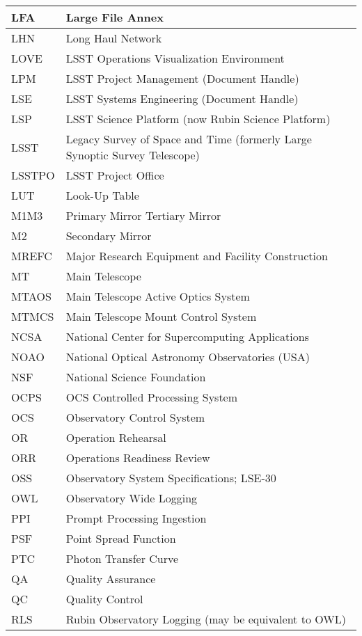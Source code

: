 \begin{longtable}{p{}p{}}
LFA & Large File Annex \\\hline
LHN & Long Haul Network \\\hline
LOVE & LSST Operations Visualization Environment \\\hline
LPM & LSST Project Management (Document Handle) \\\hline
LSE & LSST Systems Engineering (Document Handle) \\\hline
LSP & LSST Science Platform (now Rubin Science Platform) \\\hline
LSST & Legacy Survey of Space and Time (formerly Large Synoptic Survey Telescope) \\\hline
LSSTPO & LSST Project Office \\\hline
LUT & Look-Up Table \\\hline
M1M3 & Primary Mirror Tertiary Mirror \\\hline
M2 & Secondary Mirror \\\hline
MREFC & Major Research Equipment and Facility Construction \\\hline
MT & Main Telescope \\\hline
MTAOS & Main Telescope Active Optics System \\\hline
MTMCS & Main Telescope Mount Control System \\\hline
NCSA & National Center for Supercomputing Applications \\\hline
NOAO & National Optical Astronomy Observatories (USA) \\\hline
NSF & National Science Foundation \\\hline
OCPS & OCS Controlled Processing System \\\hline
OCS & Observatory Control System \\\hline
OR & Operation Rehearsal \\\hline
ORR & Operations Readiness Review \\\hline
OSS & Observatory System Specifications; LSE-30 \\\hline
OWL & Observatory Wide Logging \\\hline
PPI & Prompt Processing Ingestion \\\hline
PSF & Point Spread Function \\\hline
PTC & Photon Transfer Curve \\\hline
QA & Quality Assurance \\\hline
QC & Quality Control \\\hline
RLS & Rubin Observatory Logging (may be equivalent to OWL) \\\hline

\end{longtable}
